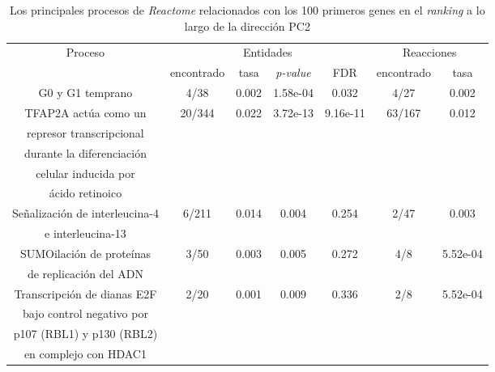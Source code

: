 

\begin{table}[!htb]
	\centering
	\caption{Los principales procesos de \textit{Reactome} relacionados con los 100 primeros genes en el \textit{ranking} a lo largo de la dirección PC2}
	\label{tab:apx6}
	\begin{tabular}{|c|c|c|c|c|c|c|}
		\hline
		\multirow{2}{*}{Proceso} & \multicolumn{4}{c|}{Entidades} & \multicolumn{2}{c|}{Reacciones} \\ \cline{2-7}
		& encontrado & tasa & \textit{p-value} & FDR & encontrado & tasa \\ \hline
		
		G0 y G1 temprano & 4/38 & 0.002 & 1.58e-04 & 0.032 & 4/27 & 0.002 \\ \hline
		
		TFAP2A actúa como un & \multirow{5}{*}{20/344} & \multirow{5}{*}{0.022} & \multirow{5}{*}{3.72e-13} & \multirow{5}{*}{9.16e-11} & \multirow{5}{*}{63/167} & \multirow{5}{*}{0.012} \\
		represor transcripcional & & & & & & \\
		durante la diferenciación & & & & & & \\
		celular inducida por & & & & & & \\
		ácido retinoico & & & & & & \\\hline
		
		Señalización de interleucina-4 & \multirow{2}{*}{6/211} & \multirow{2}{*}{0.014} & \multirow{2}{*}{0.004} & \multirow{2}{*}{0.254} & \multirow{2}{*}{2/47} & \multirow{2}{*}{0.003} \\
		e interleucina-13 & & & & & & \\\hline
		
		SUMOilación de proteínas & \multirow{2}{*}{3/50} & \multirow{2}{*}{0.003} & \multirow{2}{*}{0.005} & \multirow{2}{*}{0.272} & \multirow{2}{*}{4/8} & \multirow{2}{*}{5.52e-04} \\
		de replicación del ADN & & & & & & \\\hline
		
		Transcripción de dianas E2F & \multirow{4}{*}{2/20} & \multirow{4}{*}{0.001} & \multirow{4}{*}{0.009} & \multirow{4}{*}{0.336} & \multirow{4}{*}{2/8} & \multirow{4}{*}{5.52e-04} \\
		bajo control negativo por & & & & & & \\
		p107 (RBL1) y p130 (RBL2) & & & & & & \\
		en complejo con HDAC1 & & & & & & \\\hline
		

\end{tabular}
\end{table}
